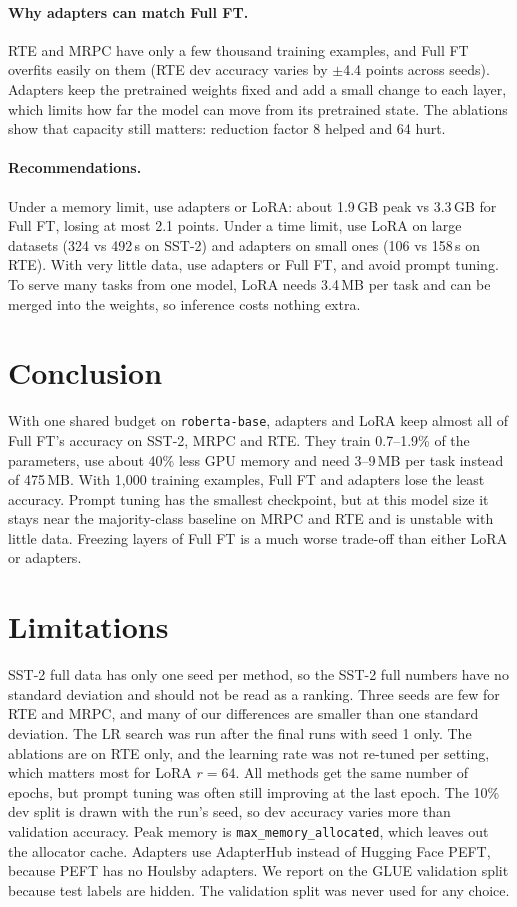 \documentclass[11pt]{article}
\begin{document}
\paragraph{Why adapters can match Full FT.} RTE and MRPC have only a few thousand training examples, and Full FT overfits easily on them (RTE dev accuracy varies by $\pm$4.4 points across seeds). Adapters keep the pretrained weights fixed and add a small change to each layer, which limits how far the model can move from its pretrained state. The ablations show that capacity still matters: reduction factor 8 helped and 64 hurt.

\paragraph{Recommendations.} Under a memory limit, use adapters or LoRA: about 1.9\,GB peak vs 3.3\,GB for Full FT, losing at most 2.1 points. Under a time limit, use LoRA on large datasets (324 vs 492\,s on SST-2) and adapters on small ones (106 vs 158\,s on RTE). With very little data, use adapters or Full FT, and avoid prompt tuning. To serve many tasks from one model, LoRA needs 3.4\,MB per task and can be merged into the weights, so inference costs nothing extra.

\section{Conclusion}

With one shared budget on \texttt{roberta-base}, adapters and LoRA keep almost all of Full FT's accuracy on SST-2, MRPC and RTE. They train 0.7--1.9\% of the parameters, use about 40\% less GPU memory and need 3--9\,MB per task instead of 475\,MB. With 1,000 training examples, Full FT and adapters lose the least accuracy. Prompt tuning has the smallest checkpoint, but at this model size it stays near the majority-class baseline on MRPC and RTE and is unstable with little data. Freezing layers of Full FT is a much worse trade-off than either LoRA or adapters.

\section*{Limitations}

SST-2 full data has only one seed per method, so the SST-2 full numbers have no standard deviation and should not be read as a ranking. Three seeds are few for RTE and MRPC, and many of our differences are smaller than one standard deviation. The LR search was run after the final runs with seed 1 only. The ablations are on RTE only, and the learning rate was not re-tuned per setting, which matters most for LoRA $r{=}64$. All methods get the same number of epochs, but prompt tuning was often still improving at the last epoch. The 10\% dev split is drawn with the run's seed, so dev accuracy varies more than validation accuracy. Peak memory is \texttt{max\_memory\_allocated}, which leaves out the allocator cache. Adapters use AdapterHub instead of Hugging Face PEFT, because PEFT has no Houlsby adapters. We report on the GLUE validation split because test labels are hidden. The validation split was never used for any choice.
\end{document}
